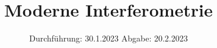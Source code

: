 

\subject{V64}
\title{Moderne Interferometrie}
\date{%
  Durchführung: 30.1.2023
  \hspace{3em}
  Abgabe: 20.2.2023
}



\maketitle
\thispagestyle{empty}
\tableofcontents
\newpage







%

\printbibliography{}


